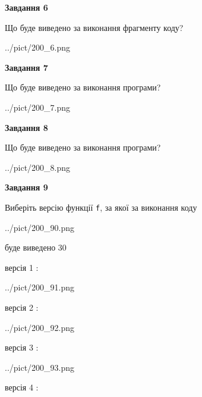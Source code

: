 \documentclass[12pt, ukrainian]{article}
\def\code#1{\Verb!#1!}
\begin{document}
{\begin {large}
{\begin {center}\textbf{Завдання 6}\end {center}}

Що буде виведено за виконання фрагменту коду?\par
\begin{center}
	{../pict/200_6.png}
\end{center}
\newpage

{\begin {center}\textbf{Завдання 7}\end {center}}

Що буде виведено за виконання програми?\par
\begin{center}
	{../pict/200_7.png}
\end{center}
\newpage

{\begin {center}\textbf{Завдання 8}\end {center}}

Що буде виведено за виконання програми?\par
\begin{center}
	{../pict/200_8.png}
\end{center}
\newpage

{\begin {center}\textbf{Завдання 9}\end {center}}

Виберіть версію функції \code{f}, за якої за виконання коду
\begin{center}
	{../pict/200_90.png}
\end{center}
буде виведено 30

\vspace{5mm}
версія 1 :

\begin{center}
	{../pict/200_91.png}
\end{center}
версія 2 :

\begin{center}
	{../pict/200_92.png}
\end{center}
версія 3 :

\begin{center}
	{../pict/200_93.png}
\end{center}
версія 4 :


\end{large}}
\end{document}
